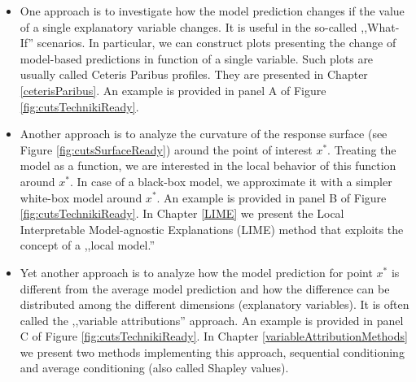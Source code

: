 \documentclass[]{krantz}
\providecommand{\tightlist}{%
  \setlength{\itemsep}{0pt}\setlength{\parskip}{0pt}}
\theoremstyle{definition}
\theoremstyle{definition}
\theoremstyle{definition}
\theoremstyle{remark}
\begin{document}
\begin{itemize}
\tightlist
\item
  One approach is to investigate how the model prediction changes if the
  value of a single explanatory variable changes. It is useful in the
  so-called ,,What-If'' scenarios. In particular, we can construct plots
  presenting the change of model-based predictions in function of a
  single variable. Such plots are usually called Ceteris Paribus
  profiles. They are presented in Chapter \ref{ceterisParibus}. An
  example is provided in panel A of Figure \ref{fig:cutsTechnikiReady}.
\item
  Another approach is to analyze the curvature of the response surface
  (see Figure \ref{fig:cutsSurfaceReady}) around the point of interest
  \(x^*\). Treating the model as a function, we are interested in the
  local behavior of this function around \(x^*\). In case of a black-box
  model, we approximate it with a simpler white-box model around
  \(x^*\). An example is provided in panel B of Figure
  \ref{fig:cutsTechnikiReady}. In Chapter \ref{LIME} we present the
  Local Interpretable Model-agnostic Explanations (LIME) method that
  exploits the concept of a ,,local model.''
\item
  Yet another approach is to analyze how the model prediction for point
  \(x^*\) is different from the average model prediction and how the
  difference can be distributed among the different dimensions
  (explanatory variables). It is often called the ,,variable
  attributions'' approach. An example is provided in panel C of Figure
  \ref{fig:cutsTechnikiReady}. In Chapter
  \ref{variableAttributionMethods} we present two methods implementing
  this approach, sequential conditioning and average conditioning (also
  called Shapley values).
\end{itemize}
\end{document}
